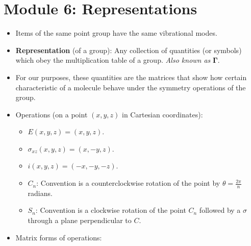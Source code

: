 \documentclass[../notes.tex]{subfiles}
\begin{document}
\section{Module 6: Representations}
\begin{itemize}
    \item Items of the same point group have the same vibrational modes.
    \item \textbf{Representation} (of a group): Any collection of quantities (or symbols) which obey the multiplication table of a group. \emph{Also known as} $\bm{\Gamma}$.
    \item For our purposes, these quantities are the matrices that show how certain characteristic of a molecule behave under the symmetry operations of the group.
    \item Operations (on a point $(x,y,z)$ in Cartesian coordinates):
    \begin{itemize}
        \item $E(x,y,z)=(x,y,z)$.
        \item $\sigma_{xz}(x,y,z)=(x,-y,z)$.
        \item $i(x,y,z)=(-x,-y,-z)$.
        \item $C_n$: Convention is a counterclockwise rotation of the point by $\theta=\frac{2\pi}{n}$ radians.
        \item $S_n$: Convention is a clockwise rotation of the point $C_n$ followed by a $\sigma$ through a plane perpendicular to $C$.
    \end{itemize}
    \item Matrix forms of operations:
\end{itemize}
\end{document}
